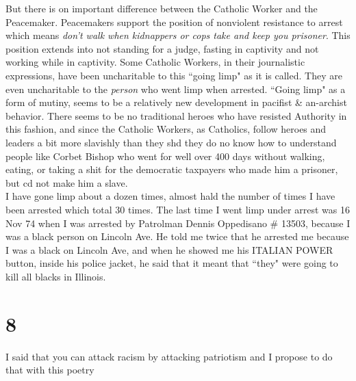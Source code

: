 \documentclass[12pt, onecolumn, letterpaper, oneside]{book}
\begin{document}
But there is on important difference between the Catholic Worker and the Peacemaker. Peacemakers support the position of nonviolent resistance to arrest which means \emph{don't walk when kidnappers or cops take and keep you prisoner}. This position extends into not standing for a judge, fasting in captivity and not working while in captivity. Some Catholic Workers, in their journalistic expressions, have been uncharitable to this ``going limp" as it is called. They are even uncharitable to the \emph{person} who went limp when arrested. ``Going limp" as a form of mutiny, seems to be a relatively new development in pacifist \& an-archist behavior. There seems to be no traditional heroes who have resisted Authority in this fashion, and since the Catholic Workers, as Catholics, follow heroes and leaders a bit more slavishly than they shd they do no know how to understand people like Corbet Bishop who went for well over 400 days without walking, eating, or taking a shit for the democratic taxpayers who made him a prisoner, but cd not make him a slave.\\
I have gone limp about a dozen times, almost hald the number of times I have been arrested which total 30 times. The last time I went limp under arrest was 16 Nov 74 when I was arrested by Patrolman Dennis Oppedisano \# 13503, because I was a black person on Lincoln Ave. He told me twice that he arrested me because I was a black on Lincoln Ave, and when he showed me his ITALIAN POWER button, inside his police jacket, he said that it meant that ``they" were going to kill all blacks in Illinois.

\section*{8}
I said that you can attack racism by attacking patriotism and I propose to do that with this poetry
\end{document}
